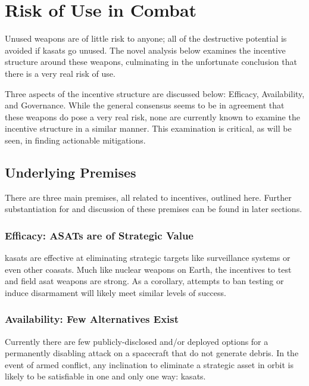 \section{Risk of Use in Combat}

Unused weapons are of little risk to anyone; all of the destructive
potential is avoided if \acp{kasat} go unused.  The novel analysis
below examines the incentive structure around these weapons,
culminating in the unfortunate conclusion that there is a very real
risk of use.

Three aspects of the incentive structure are discussed below:
Efficacy, Availability, and Governance.  While the general consensus
seems to be in agreement that these weapons do pose a very real risk,
none are currently known to examine the incentive structure in a
similar manner.  This examination is critical, as will be seen, in
finding actionable mitigations.


\subsection{Underlying Premises}

There are three main premises, all related to incentives, outlined
here.  Further substantiation for and discussion of these premises can
be found in later sections.

\subsubsection{Efficacy: ASATs are of Strategic Value}
\acp{kasat} are effective at eliminating strategic targets like
surveillance systems or even other \acp{coasat}.  Much like nuclear
weapons on Earth, the incentives to test and field \ac{asat} weapons
are strong.  As a corollary, attempts to ban testing or induce
disarmament will likely meet similar levels of success.

\subsubsection{Availability: Few Alternatives Exist}
Currently there are few publicly-disclosed and/or deployed options for
a permanently disabling attack on a spacecraft that do not generate
debris.  In the event of armed conflict, any inclination to eliminate
a strategic asset in orbit is likely to be satisfiable in one and only
one way: \acp{kasat}.

